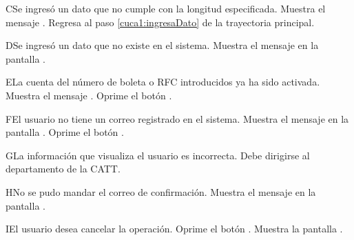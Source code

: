 \begin{UCtrayectoriaA}{C}{Se ingresó un dato que no cumple con la longitud especificada.}
	\UCpaso[\UCsist] Muestra el mensaje .
	\UCpaso[] Regresa al paso \ref{cuca1:ingresaDato} de la trayectoria principal.
\end{UCtrayectoriaA}

\begin{UCtrayectoriaA}{D}{Se ingresó un dato que no existe en el sistema.}
	\UCpaso[\UCsist] Muestra el mensaje  en la pantalla .
\end{UCtrayectoriaA}

\begin{UCtrayectoriaA}{E}{La cuenta del número de boleta o RFC introducidos ya ha sido activada.}
	\UCpaso[\UCsist] Muestra el mensaje .
	\UCpaso[\UCactor] Oprime el botón . 
\end{UCtrayectoriaA}

\begin{UCtrayectoriaA}{F}{El usuario no tiene un correo registrado en el sistema.}
	\UCpaso[\UCsist] Muestra el mensaje   en la pantalla .
	\UCpaso[\UCactor] Oprime el botón . 
\end{UCtrayectoriaA}

\begin{UCtrayectoriaA}{G}{La información que visualiza el usuario es incorrecta.}
	\UCpaso[\UCactor] Debe dirigirse al departamento de la CATT. 
\end{UCtrayectoriaA}

\begin{UCtrayectoriaA}{H}{No se pudo mandar el correo de confirmación.}
	\UCpaso[\UCsist] Muestra el mensaje  en la pantalla .
\end{UCtrayectoriaA}

\begin{UCtrayectoriaA}{I}{El usuario desea cancelar la operación.}
	\UCpaso[\UCactor] Oprime el botón .
	\UCpaso[\UCsist] Muestra la pantalla .
\end{UCtrayectoriaA}